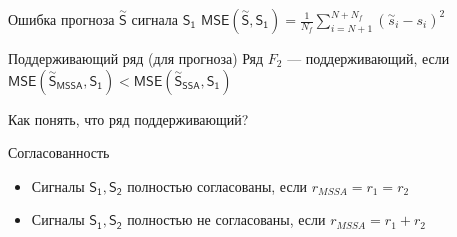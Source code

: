 \documentclass[ucs, notheorems, handout]{beamer}
\begin{document}
\begin{frame}
    \begin{block}{Ошибка прогноза $\overset{\sim}{\mathsf{S}}$ сигнала $\mathsf{S_1}$}
        $\mathsf{MSE(\overset{\sim}{S}, S_1)} = \frac{1}{N_{f}} \sum_{i = N + 1}^{N + N_{f}} (\overset{\sim}{s}_i - s_i)^2$
    \end{block}

    \begin{block}{Поддерживающий ряд (для прогноза)}
        Ряд $F_2$ --- поддерживающий, если $\mathsf{MSE(\overset{\sim}{S}_{MSSA}, S_1)} < \mathsf{MSE(\overset{\sim}{S}_{SSA}, S_1)}$
    \end{block}

     Как понять, что ряд поддерживающий? 

    \begin{block}{Согласованность}
        \begin{itemize}
            \item Сигналы $\mathsf{S_1, S_2}$ полностью согласованы, если $r_{MSSA} = r_1 = r_2$
            \item Сигналы $\mathsf{S_1, S_2}$ полностью не согласованы, если $r_{MSSA} = r_1 + r_2$
        \end{itemize}
    \end{block}
\end{frame}
\end{document}
